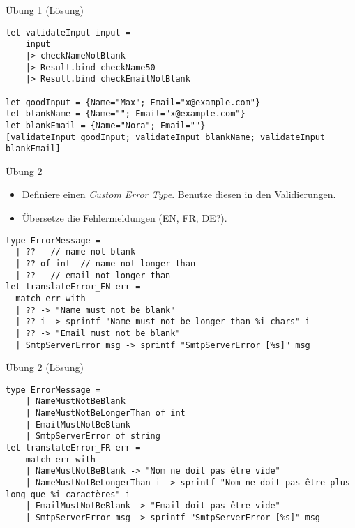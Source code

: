 \documentclass[t]{beamer}
\begin{document}
\begin{frame}[label={sec:orgba99ab5},fragile]{Übung 1 (Lösung)}
 \begin{verbatim}
let validateInput input =
    input
    |> checkNameNotBlank
    |> Result.bind checkName50
    |> Result.bind checkEmailNotBlank

let goodInput = {Name="Max"; Email="x@example.com"}
let blankName = {Name=""; Email="x@example.com"}
let blankEmail = {Name="Nora"; Email=""}
[validateInput goodInput; validateInput blankName; validateInput blankEmail]
\end{verbatim}
\end{frame}

\begin{frame}[label={sec:org8603c31},fragile]{Übung 2}
 \begin{itemize}
\item Definiere einen \emph{Custom Error Type}. Benutze diesen in den Validierungen.
\item Übersetze die Fehlermeldungen (EN, FR, DE?).
\end{itemize}

\begin{verbatim}
type ErrorMessage =
  | ??   // name not blank
  | ?? of int  // name not longer than
  | ??   // email not longer than
let translateError_EN err =
  match err with
  | ?? -> "Name must not be blank"
  | ?? i -> sprintf "Name must not be longer than %i chars" i
  | ?? -> "Email must not be blank"
  | SmtpServerError msg -> sprintf "SmtpServerError [%s]" msg
\end{verbatim}
\end{frame}

\begin{frame}[label={sec:org02e8a66},fragile]{Übung 2 (Lösung)}
 \begin{verbatim}
type ErrorMessage =
    | NameMustNotBeBlank
    | NameMustNotBeLongerThan of int
    | EmailMustNotBeBlank
    | SmtpServerError of string
let translateError_FR err =
    match err with
    | NameMustNotBeBlank -> "Nom ne doit pas être vide"
    | NameMustNotBeLongerThan i -> sprintf "Nom ne doit pas être plus long que %i caractères" i
    | EmailMustNotBeBlank -> "Email doit pas être vide"
    | SmtpServerError msg -> sprintf "SmtpServerError [%s]" msg
\end{verbatim}
\end{frame}
\end{document}
